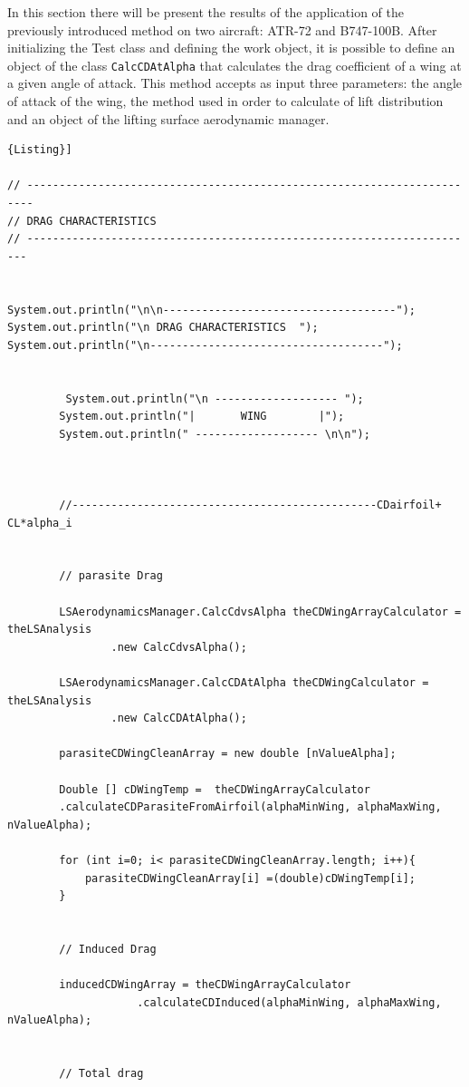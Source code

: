 In this section there will be present the results of the application of the previously introduced method on two aircraft: ATR-72 and B747-100B.
After initializing the Test class and defining the work object, it is possible to define an object of the class \texttt{CalcCDAtAlpha} that calculates the drag coefficient of a wing at a given angle of attack. This method accepts as input three parameters: the angle of attack of the wing,  the method used in order to calculate of lift distribution and an object of the lifting surface aerodynamic manager.
\noindent \\
\begin{lstlisting}[frame=rbl,caption={{\footnotesize Use of Drag Calculator class}},label= [style=\bfseries]{Listing}]

// -----------------------------------------------------------------------
// DRAG CHARACTERISTICS 
// ----------------------------------------------------------------------


System.out.println("\n\n------------------------------------");
System.out.println("\n DRAG CHARACTERISTICS  ");
System.out.println("\n------------------------------------");


         System.out.println("\n ------------------- ");
		System.out.println("|       WING        |");
		System.out.println(" ------------------- \n\n");



		//-----------------------------------------------CDairfoil+ CL*alpha_i


		// parasite Drag

		LSAerodynamicsManager.CalcCdvsAlpha theCDWingArrayCalculator = theLSAnalysis
				.new CalcCdvsAlpha();

		LSAerodynamicsManager.CalcCDAtAlpha theCDWingCalculator = theLSAnalysis
				.new CalcCDAtAlpha();

		parasiteCDWingCleanArray = new double [nValueAlpha];

		Double [] cDWingTemp =  theCDWingArrayCalculator
		.calculateCDParasiteFromAirfoil(alphaMinWing, alphaMaxWing, nValueAlpha);
		
		for (int i=0; i< parasiteCDWingCleanArray.length; i++){
			parasiteCDWingCleanArray[i] =(double)cDWingTemp[i];
		}


		// Induced Drag 

		inducedCDWingArray = theCDWingArrayCalculator
		            .calculateCDInduced(alphaMinWing, alphaMaxWing, nValueAlpha);


		// Total drag


\end{lstlisting}
